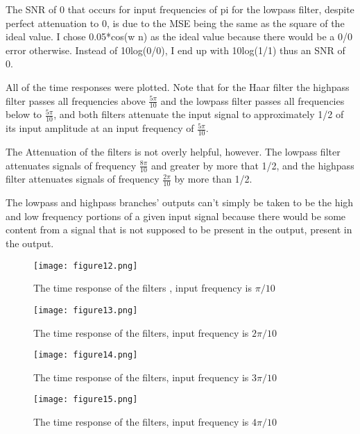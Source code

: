 \documentclass[12pt]{scrartcl} %
\begin{document}
	 	The SNR of 0 that occurs for input frequencies of pi for the lowpass filter, despite perfect attenuation to 0, is due to the MSE being the same as the  square of the ideal value. I chose 0.05*cos(w n) as the ideal value because there would be a 0/0 error otherwise. Instead of 10log(0/0), I end up with 10log(1/1) thus an SNR of 0.
	 	
	 	\vspace{5mm}
	
		All of the time responses were plotted. Note that for the Haar filter the highpass filter passes all frequencies above $\frac{5\pi}{10}$ and the lowpass filter passes all frequencies below to $\frac{5\pi}{10}$, and both filters attenuate the input signal to approximately 1/2 of its input amplitude at an input frequency of $\frac{5\pi}{10}$.

	 	\vspace{5mm}
		
		The Attenuation of the filters is not overly helpful, however. The lowpass filter attenuates signals of frequency $\frac{8\pi}{10}$ and greater by more that 1/2, and the highpass filter attenuates signals of frequency $\frac{2\pi}{10}$ by more than 1/2.
		
			 	\vspace{5mm}
		
		The lowpass and highpass branches' outputs can't simply be taken to be the high and low frequency portions of a given input signal because there would be some content from a signal that is not supposed to be present in the output, present in the output.
	
	
			\begin{figure}[H]
			\centering
			\texttt{[image: figure12.png]}
			\caption{The time response of the filters , input frequency is $\pi/10$}
			\end{figure}
	
			\begin{figure}[H]
				\centering
				\texttt{[image: figure13.png]}
				\caption{The time response of the filters, input frequency is  $2\pi/10$}
			\end{figure}

			\begin{figure}[H]
				\centering
				\texttt{[image: figure14.png]}
				\caption{The time response of the filters, input frequency is  $3\pi/10$}
			\end{figure}

			\begin{figure}[H]
				\centering
				\texttt{[image: figure15.png]}
				\caption{The time response of the filters, input frequency is  $4\pi/10$}
			\end{figure}
\end{document}
